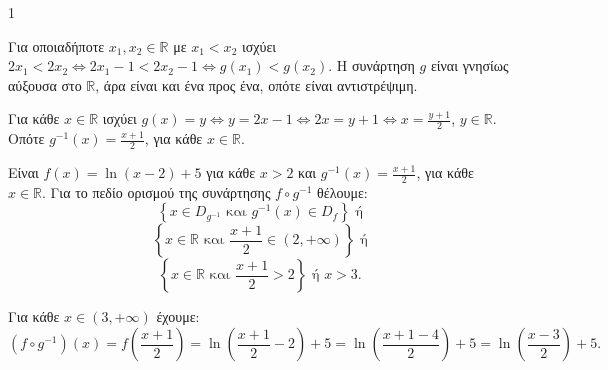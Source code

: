 \begin{ylh}{1}
    \item [ΛΥΣΗ]
\end{ylh}
\begin{alist}
    \item[\textalpha)]
    \begin{rlist}
        \item Για οποιαδήποτε $x_1, x_2 \in \mathbb{R}$ με $x_1 < x_2$ ισχύει $2x_1 < 2x_2 \Leftrightarrow 2x_1 - 1 < 2x_2 - 1 \Leftrightarrow g(x_1) < g(x_2)$.
        Η συνάρτηση $g$ είναι γνησίως αύξουσα στο $\mathbb{R}$, άρα είναι και ένα προς ένα, οπότε είναι αντιστρέψιμη.

        \item Για κάθε $x \in \mathbb{R}$ ισχύει $g(x) = y \Leftrightarrow y = 2x-1 \Leftrightarrow 2x = y+1 \Leftrightarrow x = \frac{y+1}{2}$, $y \in \mathbb{R}$.
        Οπότε $g^{-1}(x) = \frac{x+1}{2}$, για κάθε $x \in \mathbb{R}$.
    \end{rlist}

    \item[\textbeta)]
    \begin{rlist}
        \item Είναι $f(x) = \ln(x-2) + 5$ για κάθε $x > 2$ και $g^{-1}(x) = \frac{x+1}{2}$, για κάθε $x \in \mathbb{R}$.
        Για το πεδίο ορισμού της συνάρτησης $f \circ g^{-1}$ θέλουμε:
        \[
        \left\{x \in D_{g^{-1}} \text{ και } g^{-1}(x) \in D_f \right\} \text{ ή}
        \]
        \[
        \left\{x \in \mathbb{R} \text{ και } \frac{x+1}{2} \in (2, +\infty) \right\} \text{ ή}
        \]
        \[
        \left\{x \in \mathbb{R} \text{ και } \frac{x+1}{2} > 2 \right\} \text{ ή } x > 3.
        \]

        \item Για κάθε $x \in (3, +\infty)$ έχουμε:
        \[
        (f \circ g^{-1})(x) = f\left(\frac{x+1}{2}\right) = \ln\left(\frac{x+1}{2}-2\right) + 5 = \ln\left(\frac{x+1-4}{2}\right) + 5 = \ln\left(\frac{x-3}{2}\right) + 5.
        \]
    \end{rlist}
\end{alist}
